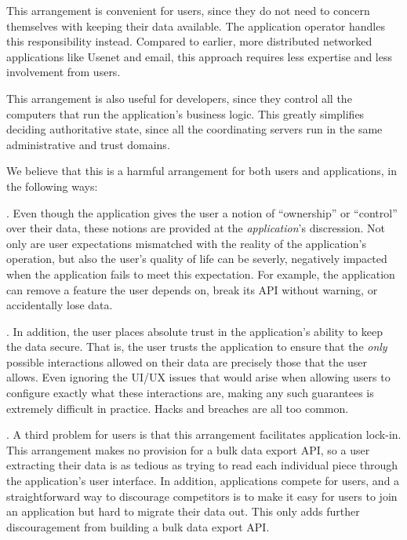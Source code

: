 This arrangement is convenient for users, since they do not need to concern
themselves with keeping their data available.  The application operator handles
this responsibility instead.  Compared to earlier, more distributed networked
applications like Usenet and email, this approach requires less expertise and
less involvement from users.

This arrangement is also useful for developers, since they 
control all the computers that run the
application's business logic.  This greatly simplifies deciding authoritative
state, since all the coordinating servers run in the same administrative and
trust domains.  



We believe that this is a harmful arrangement for both users and applications,
in the following ways:

.  Even though the application gives
the user a notion of ``ownership'' or
``control'' over their data, these notions are provided at the
\textit{application}'s discression.  Not only are user expectations mismatched
with the reality of the application's operation, but also the user's quality of
life can be severly, negatively impacted when the application fails to
meet this expectation.  For example, the application can remove a feature the
user depends on, break its API without warning, or accidentally lose data.

.  In addition, the user places
absolute trust in the application's ability to keep the
data secure.  That is, the user trusts the application to ensure that the \textit{only}
possible interactions allowed on their data are precisely those that the user
allows.  Even ignoring the UI/UX issues that would arise when allowing users to
configure exactly what these interactions are, making any such guarantees is extremely
difficult in practice.  Hacks and breaches are all too common.

.  A third problem for users is that this arrangement
facilitates application lock-in.
This arrangement makes no provision for a bulk data export API, so a user
extracting their data is as tedious as trying to read each individual piece
through the application's user interface.  In addition,
applications compete for users, and a straightforward way to discourage
competitors is to make it easy for users to join an application but hard to
migrate their data out.  This only adds further discouragement from building
a bulk data export API.

